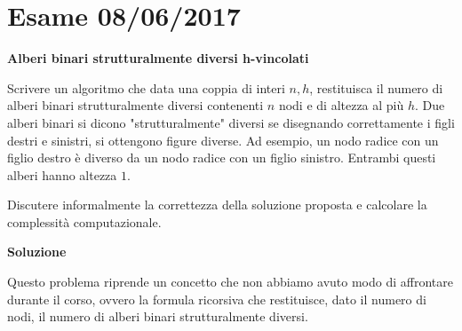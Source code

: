 \documentclass[../cheatSheetAlgoritmi.tex]{subfiles}
\begin{document}
\section{Esame 08/06/2017}
\textbf{Alberi binari strutturalmente diversi h-vincolati} 

Scrivere un algoritmo che data una coppia di interi $n, h$, restituisca il numero di alberi binari strutturalmente diversi contenenti $n$ nodi e di altezza al più $h$. 
Due alberi binari si dicono "strutturalmente" diversi se disegnando correttamente i figli destri e sinistri, si ottengono figure diverse. 
Ad esempio, un nodo radice con un figlio destro è diverso da un nodo radice con un figlio sinistro. Entrambi questi alberi hanno altezza $1$. 

Discutere informalmente la correttezza della soluzione proposta e calcolare la complessità computazionale. 

\textbf{Soluzione} 

Questo problema riprende un concetto che non abbiamo avuto modo di affrontare durante il corso, ovvero la formula ricorsiva che restituisce, dato il numero di nodi, il numero di alberi binari strutturalmente diversi. 
\end{document}
